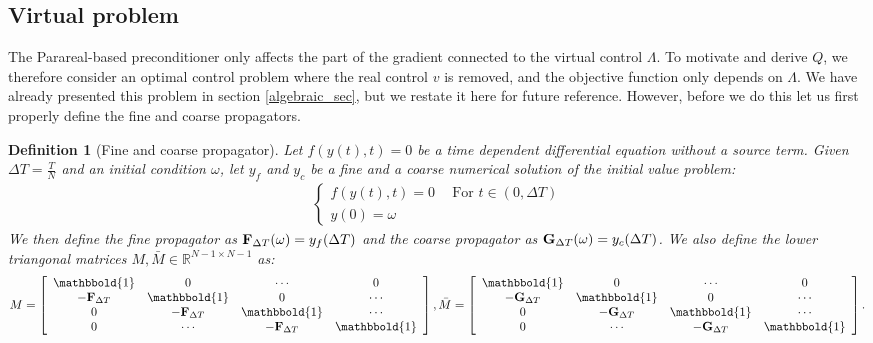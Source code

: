 \documentclass[11pt,a4paper]{article}
\newtheorem{definition}{Definition}
\begin{document}
\subsection{Virtual problem} \label{vir_sec}
The Parareal-based preconditioner only affects the part of the gradient connected to the virtual control $\Lambda$. To motivate and derive $Q$, we therefore consider an optimal control problem where the real control $v$ is removed, and the objective function only depends on $\Lambda$. We have already presented this problem in section \ref{algebraic_sec}, but we restate it here for future reference. However, before we do this let us first properly define the fine and coarse propagators.
\begin{definition}[Fine and coarse propagator] \label{prop_def}
Let $f(y(t),t)=0$ be a time dependent differential equation without a source term. Given $\Delta T=\frac{T}{N}$ and an initial condition $\omega$, let $y_f$ and $y_c$ be a fine and a coarse numerical solution of the initial value problem:
\begin{align}
 \left\{
     \begin{array}{lr}
		f(y(t),t)=0 \ \quad \textrm{For $t \in (0,\Delta T)$} \\
		y(0)=\omega
	\end{array}
	\right.	
\end{align}
We then define the fine propagator as $\bold F_{\Delta T}(\omega) = y_f(\Delta T)$ and the coarse propagator as $\bold G_{\Delta T}(\omega) = y_c(\Delta T)$. We also define the lower triangonal matrices $M,\bar M\in\mathbb{R}^{N-1\times N-1}$ as: 
\begin{align*}
M= \left[ \begin{array}{cccc}
   \mathbbold{1} & 0 & \cdots & 0 \\  
   -\bold{F}_{\Delta T} & \mathbbold{1} & 0 & \cdots \\ 
   0 &-\bold{F}_{\Delta T} & \mathbbold{1}  & \cdots \\
   0 &\cdots &-\bold{F}_{\Delta T} & \mathbbold{1}  \\
   \end{array}  \right],
\bar M= \left[ \begin{array}{cccc}
   \mathbbold{1} & 0 & \cdots & 0 \\  
   -\bold{G}_{\Delta T} & \mathbbold{1} & 0 & \cdots \\ 
   0 &-\bold{G}_{\Delta T} & \mathbbold{1}  & \cdots \\
   0 &\cdots &-\bold{G}_{\Delta T} & \mathbbold{1}   \\
   \end{array}  \right].
\end{align*}
\end{definition}
\end{document}
